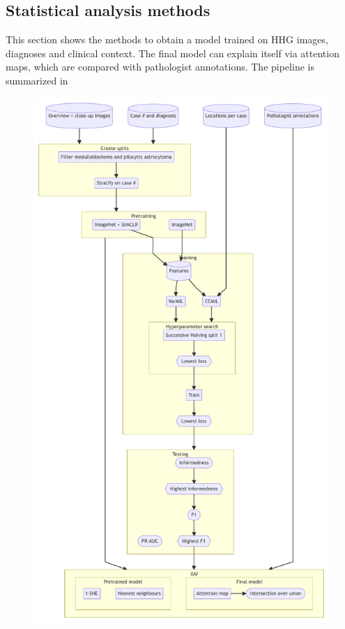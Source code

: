 \subsection{Statistical analysis methods}
This section shows the methods to obtain a model trained on HHG images, diagnoses and clinical context.
The final model can explain itself via attention maps, which are compared with pathologist annotations.
The pipeline is summarized in

\begin{figure}
    \centering
    \includegraphics[width=\linewidth]{mermaid/brain/analytical-methods.pdf}

\end{figure}
